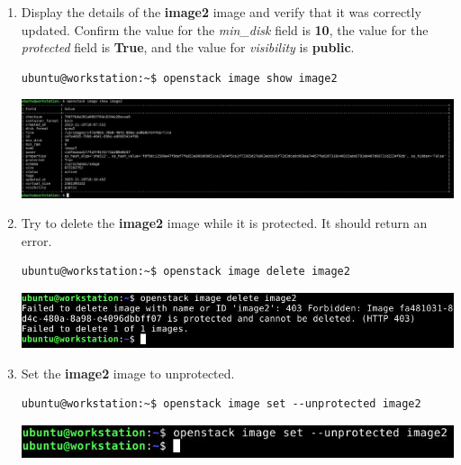 \documentclass[letterpaper, 12pt]{article}
\begin{document}
\begin{enumerate}
    \item Display the details of the \textbf{image2} image and verify that it was correctly updated. Confirm the value
    for the \textit{min\_disk} field is \textbf{10}, the value for the \textit{protected} field is \textbf{True}, and
    the value for \textit{visibility} is \textbf{public}.
\begin{lstlisting}
ubuntu@workstation:~$ openstack image show image2
\end{lstlisting}

    \begin{center}
        \includegraphics[width=\linewidth]{images/part1/step15.png}
    \end{center}

    \item Try to delete the \textbf{image2} image while it is protected. It should return an error.
\begin{lstlisting}
ubuntu@workstation:~$ openstack image delete image2
\end{lstlisting}

    \begin{center}
        \includegraphics[width=\linewidth]{images/part1/step16.png}
    \end{center}

    \item Set the \textbf{image2} image to unprotected.
\begin{lstlisting}
ubuntu@workstation:~$ openstack image set --unprotected image2
\end{lstlisting}

    \begin{center}
        \includegraphics[width=\linewidth]{images/part1/step17.png}
    \end{center}


\end{enumerate}
\end{document}

